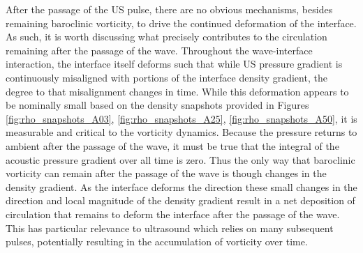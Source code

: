 After the passage of the \ac{US} pulse, there are no obvious
mechanisms, besides remaining baroclinic vorticity, to drive the
continued deformation of the interface. As such, it is worth
discussing what precisely contributes to the circulation remaining
after the passage of the wave. Throughout the wave-interface
interaction, the interface itself deforms such that while \ac{US}
pressure gradient is continuously misaligned with portions of the
interface density gradient, the degree to that misalignment changes in
time. While this deformation appears to be nominally small based on
the density snapshots provided in Figures \ref{fig:rho_snapshots_A03},
\ref{fig:rho_snapshots_A25}, \ref{fig:rho_snapshots_A50}, it is
measurable and critical to the vorticity dynamics. Because the
pressure returns to ambient after the passage of the wave, it must be
true that the integral of the acoustic pressure gradient over all time
is zero. Thus the only way that baroclinic vorticity can remain after
the passage of the wave is though changes in the density gradient. As
the interface deforms the direction these small changes in the
direction and local magnitude of the density gradient result in a net
deposition of circulation that remains to deform the interface after
the passage of the wave. This has particular relevance to ultrasound
which relies on many subsequent pulses, potentially resulting in the
accumulation of vorticity over time.
